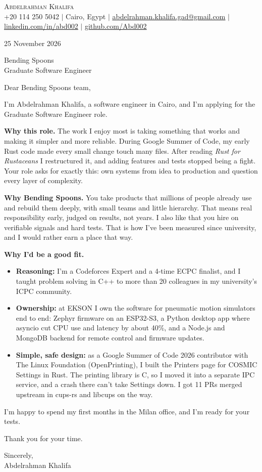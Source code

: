 \documentclass[letterpaper,11pt]{article}
\begin{document}
\begin{center}
    {\Huge \scshape Abdelrahman Khalifa} \\ \vspace{4pt}
    \small +20 114 250 5042 $|$ Cairo, Egypt $|$
    \href{mailto:abdelrahman.khalifa.gad@gmail.com}{\underline{abdelrahman.khalifa.gad@gmail.com}} $|$
    \href{https://www.linkedin.com/in/abd002}{\underline{linkedin.com/in/abd002}} $|$
    \href{https://github.com/Abd002}{\underline{github.com/Abd002}}
\end{center}

\vspace{6pt}
25 November 2026

Bending Spoons \\
Graduate Software Engineer

Dear Bending Spoons team,

I'm Abdelrahman Khalifa, a software engineer in Cairo, and I'm applying for the Graduate Software Engineer role.

\textbf{Why this role.} The work I enjoy most is taking something that works and making it simpler and more reliable. During Google Summer of Code, my early Rust code made every small change touch many files. After reading \emph{Rust for Rustaceans} I restructured it, and adding features and tests stopped being a fight. Your role asks for exactly this: own systems from idea to production and question every layer of complexity.

\textbf{Why Bending Spoons.} You take products that millions of people already use and rebuild them deeply, with small teams and little hierarchy. That means real responsibility early, judged on results, not years. I also like that you hire on verifiable signals and hard tests. That is how I've been measured since university, and I would rather earn a place that way.

\textbf{Why I'd be a good fit.}
\begin{itemize}
  \setlength\itemsep{2pt}
  \item \textbf{Reasoning:} I'm a Codeforces Expert and a 4-time ECPC finalist, and I taught problem solving in C++ to more than 20 colleagues in my university's ICPC community.
  \item \textbf{Ownership:} at EKSON I own the software for pneumatic motion simulators end to end: Zephyr firmware on an ESP32-S3, a Python desktop app where asyncio cut CPU use and latency by about 40\%, and a Node.js and MongoDB backend for remote control and firmware updates.
  \item \textbf{Simple, safe design:} as a Google Summer of Code 2026 contributor with The Linux Foundation (OpenPrinting), I built the Printers page for COSMIC Settings in Rust. The printing library is C, so I moved it into a separate IPC service, and a crash there can't take Settings down. I got 11 PRs merged upstream in cups-rs and libcups on the way.
\end{itemize}

I'm happy to spend my first months in the Milan office, and I'm ready for your tests.

Thank you for your time.

Sincerely, \\
Abdelrahman Khalifa
\end{document}
